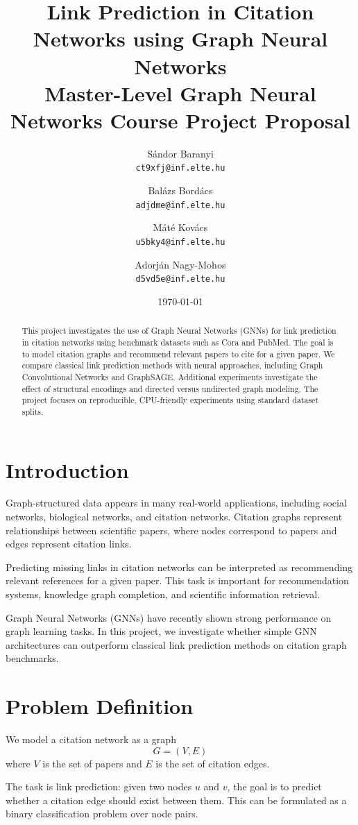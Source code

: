 \documentclass[11pt,a4paper]{article}
\title{
Link Prediction in Citation Networks using Graph Neural Networks\\
\large Master-Level Graph Neural Networks Course Project Proposal
}
\author{
S\'andor Baranyi \\ \texttt{ct9xfj@inf.elte.hu}
\and
Bal\'azs Bord\'acs \\ \texttt{adjdme@inf.elte.hu}
\and
M\'at\'e Kov\'acs \\ \texttt{u5bky4@inf.elte.hu}
\and
Adorj\'an Nagy-Mohos \\ \texttt{d5vd5e@inf.elte.hu}
}
\date{\today}
\begin{document}
\maketitle

\begin{abstract}
This project investigates the use of Graph Neural Networks (GNNs) for link prediction
in citation networks using benchmark datasets such as Cora and PubMed.
The goal is to model citation graphs and recommend relevant papers to cite for a given paper.
We compare classical link prediction methods with neural approaches,
including Graph Convolutional Networks and GraphSAGE.
Additional experiments investigate the effect of structural encodings and
directed versus undirected graph modeling.
The project focuses on reproducible, CPU-friendly experiments using standard dataset splits.
\end{abstract}

\section{Introduction}

Graph-structured data appears in many real-world applications,
including social networks, biological networks, and citation networks.
Citation graphs represent relationships between scientific papers,
where nodes correspond to papers and edges represent citation links.

Predicting missing links in citation networks can be interpreted as
recommending relevant references for a given paper.
This task is important for recommendation systems, knowledge graph completion,
and scientific information retrieval.

Graph Neural Networks (GNNs) have recently shown strong performance
on graph learning tasks.
In this project, we investigate whether simple GNN architectures
can outperform classical link prediction methods
on citation graph benchmarks.

\section{Problem Definition}

We model a citation network as a graph
\[
G = (V, E)
\]
where $V$ is the set of papers and $E$ is the set of citation edges.

The task is link prediction: given two nodes $u$ and $v$, the goal is to predict
whether a citation edge should exist between them.
This can be formulated as a binary classification problem over node pairs.
\end{document}

